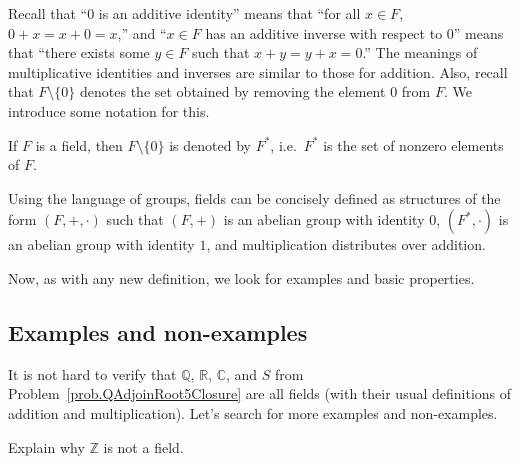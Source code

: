 Recall that ``$0$ is an additive identity'' means that ``for all $x\in F$, $0+x = x+0 = x$,'' and ``$x\in F$ has an additive inverse with respect to $0$'' means that ``there exists some $y\in F$ such that $x+y = y+x = 0$.'' The meanings of multiplicative identities and inverses are similar to those for addition. Also, recall that $F\setminus\{0\}$ denotes the set obtained by removing the element $0$ from $F$. We introduce some notation for this.

\begin{definition}
If $F$ is a field, then $F\setminus\{0\}$ is denoted by $F^*$, i.e.~$F^*$ is the set of nonzero elements of $F$.
\end{definition}

Using the language of groups, fields can be concisely defined as structures of the form $(F,+,\cdot)$ such that $(F,+)$ is an abelian group with identity $0$,  $(F^*,\cdot)$ is an abelian group with identity $1$, and multiplication distributes over addition.

Now, as with any new definition, we look for examples and basic properties.

\subsection{Examples and non-examples}

It is not hard to verify that $\mathbb{Q}$, $\mathbb{R}$, $\mathbb{C}$, and $S$ from Problem~\ref{prob.QAdjoinRoot5Closure} are all fields (with their usual definitions of addition and multiplication). Let's search for more examples and non-examples.

\begin{problem}
Explain why $\mathbb{Z}$ is not a field.
\end{problem}


